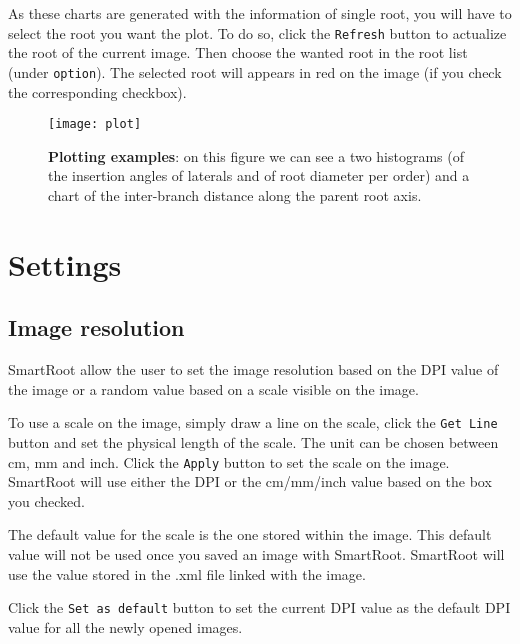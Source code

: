 \documentclass[a4paper,english,10pt]{report}
\begin{document}
As these charts are generated with the information of single root, you will have to select the root you want the plot. To do so, click the \verb|Refresh| button to actualize the root of the current image. Then choose the wanted root in the root list (under \verb|option|). The selected root will appears in red on the image (if you check the corresponding checkbox).\\

  \begin{figure}[htbp]
\begin{center}
\texttt{[image: plot]}
\caption[Plotting examples]{\textbf{Plotting examples}:  on this figure we can see a two histograms (of the insertion angles of laterals and of root diameter per order) and a chart of the inter-branch distance along the parent root axis.}
\label{plot}
\end{center}
\end{figure}



\newpage
{\color{coolSection}\section{Settings}}
\label{chapsettings}

\subsection{Image resolution}  
\label{resolution_options}

SmartRoot allow the user to set the image resolution based on the DPI value of the image or a random value based on a scale visible on the image. 

To use a scale on the image, simply draw a line on the scale, click the \verb|Get Line| button and set the physical length of the scale. The unit can be chosen between cm, mm and inch. Click the \verb|Apply| button to set the scale on the image. SmartRoot will use either the DPI or the cm/mm/inch value based on the box you checked. 

The default value for the scale is the one stored within the image. This default value will not be used once you saved an image with SmartRoot. SmartRoot will use the value stored in the .xml file linked with the image.

Click the \verb|Set as default| button to set the current DPI value as the default DPI value for all the newly opened images.
\end{document}
